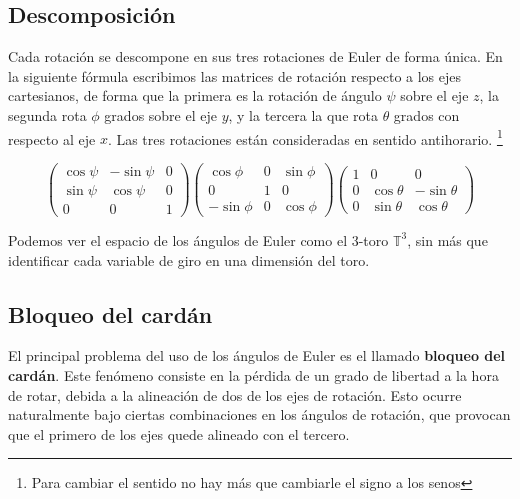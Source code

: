 \documentclass{article}
\theoremstyle{plain}
\theoremstyle{definition}
\theoremstyle{remark}
\begin{document}

\subsection{Descomposición}


Cada rotación se descompone en sus tres rotaciones de Euler de forma
única.  En la siguiente fórmula escribimos las matrices de rotación
respecto a los ejes cartesianos, de forma que la primera es la
rotación de ángulo $\psi$ sobre el eje $z$, la segunda rota $\phi$
grados sobre el eje $y$, y la tercera la que rota $\theta$ grados con
respecto al eje $x$. Las tres rotaciones están consideradas en sentido
antihorario.  \footnote{Para cambiar el sentido no hay más que
  cambiarle el signo a los senos}

\[\begin{pmatrix}
    \cos \psi & -\sin \psi & 0 \\
    \sin \psi & \cos \psi & 0 \\
    0 & 0 & 1
  \end{pmatrix}\begin{pmatrix}
      \cos \phi & 0 & \sin \phi \\
      0 & 1 & 0 \\
      -\sin \phi & 0 & \cos \phi
    \end{pmatrix}\begin{pmatrix}
    1 & 0 & 0 \\
    0 & \cos \theta & -\sin \theta \\
    0 & \sin \theta & \cos \theta
  \end{pmatrix}
\]

Podemos ver el espacio de los ángulos de Euler como el 3-toro
$\mathbb T^3$, sin más que identificar cada variable de giro en una
dimensión del toro.


\subsection{Bloqueo del cardán}

El principal problema del uso de los ángulos de Euler es el llamado
\textbf{bloqueo del cardán}. Este fenómeno consiste en la pérdida de
un grado de libertad a la hora de rotar, debida a la alineación de dos
de los ejes de rotación. Esto ocurre naturalmente bajo ciertas
combinaciones en los ángulos de rotación, que provocan que el primero
de los ejes quede alineado con el tercero.
\end{document}

